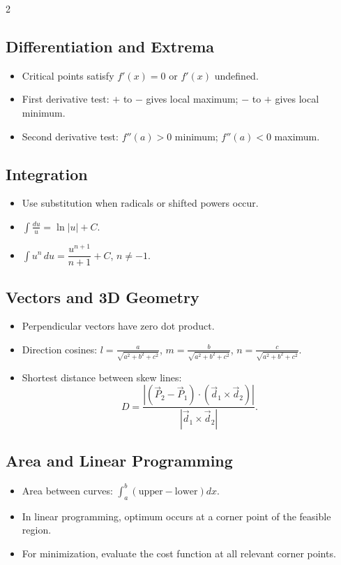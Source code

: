 \documentclass[11pt,a4paper]{article}
\begin{document}
\begin{multicols}{2}
\subsection*{Differentiation and Extrema}
\begin{itemize}[leftmargin=*]
\item Critical points satisfy $f'(x)=0$ or $f'(x)$ undefined.
\item First derivative test: $+$ to $-$ gives local maximum; $-$ to $+$ gives local minimum.
\item Second derivative test: $f''(a)>0$ minimum; $f''(a)<0$ maximum.
\end{itemize}

\subsection*{Integration}
\begin{itemize}[leftmargin=*]
\item Use substitution when radicals or shifted powers occur.
\item $\int \frac{du}{u}=\ln|u|+C$.
\item $\int u^n\,du=\dfrac{u^{n+1}}{n+1}+C$, $n\ne-1$.
\end{itemize}

\subsection*{Vectors and 3D Geometry}
\begin{itemize}[leftmargin=*]
\item Perpendicular vectors have zero dot product.
\item Direction cosines: $l=\frac{a}{\sqrt{a^2+b^2+c^2}}$, $m=\frac{b}{\sqrt{a^2+b^2+c^2}}$, $n=\frac{c}{\sqrt{a^2+b^2+c^2}}$.
\item Shortest distance between skew lines:
\[
D=\frac{|(\vec P_2-\vec P_1)\cdot(\vec d_1\times\vec d_2)|}{|\vec d_1\times\vec d_2|}.
\]
\end{itemize}

\subsection*{Area and Linear Programming}
\begin{itemize}[leftmargin=*]
\item Area between curves: $\int_a^b(\text{upper}-\text{lower})dx$.
\item In linear programming, optimum occurs at a corner point of the feasible region.
\item For minimization, evaluate the cost function at all relevant corner points.
\end{itemize}
\end{multicols}
\end{document}
